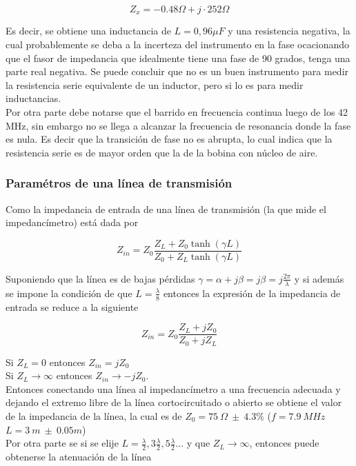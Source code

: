 \documentclass[a4paper,10pt]{article}
\begin{document}
		$$Z_x=-0.48\Omega+j\cdot 252\Omega$$
		
		\indent Es decir, se obtiene una inductancia de $L=0,96 \mu F$ y una 
		resistencia negativa, la cual probablemente se deba a la incerteza del 
		instrumento en la fase ocacionando que el fasor de impedancia que 
		idealmente tiene una fase de 90 grados, tenga una parte real negativa. 
		Se puede concluir que no es un buen instrumento para medir la 
		resistencia serie equivalente de un inductor, pero si lo es para medir 
		inductancias. \\
		\indent Por otra parte debe notarse que el barrido en frecuencia 
		continua luego de los 42 MHz, sin embargo no se llega a alcanzar la 
		frecuencia de resonancia donde la fase es nula. Es decir que la 
		transici\'on de fase no es abrupta, lo cual indica que la resistencia 
		serie es de mayor orden que la de la bobina con n\'ucleo de aire. 

		\subsubsection{Param\'etros de una l\'inea de transmisi\'on}
		
		\indent Como la impedancia de entrada de una l\'inea de transmisi\'on 
		(la que mide el impedanc\'imetro) est\'a dada por 
		
		$$Z_{in}=Z_0\frac{Z_L+Z_0\tanh(\gamma L)}{Z_0+Z_L\tanh(\gamma L)}$$
		
		\indent Suponiendo que la l\'inea es de bajas p\'erdidas 
		$\gamma=\alpha+j\beta=j\beta=j\frac{2\pi}{\lambda}$ y si adem\'as se 
		impone la condici\'on de que $L=\frac{\lambda}{8}$ entonces la 
		expresi\'on de la impedancia de entrada se reduce a la siguiente
		
		$$Z_{in}=Z_0\frac{Z_L+jZ_0}{Z_0+jZ_L}$$
		
		\indent Si $Z_L= 0$ entonces $Z_{in}=jZ_0$ \\
		\indent Si $Z_L \rightarrow \infty$ entonces $Z_{in}\rightarrow-jZ_0$.\\
		\indent Entonces conectando una l\'inea al impedanc\'imetro a una 
		frecuencia adecuada y dejando el extremo libre de la l\'inea 
		cortocircuitado o abierto se obtiene el valor de la impedancia de la 
		l\'inea, la cual es de 
		$Z_0=75~\Omega~\pm~4.3\%$ ($f=7.9~MHz$ $L=3~m~\pm~0.05m$) \\
		
		\indent Por otra parte se si se elije 
		$L=\frac{\lambda}{2},3\frac{\lambda}{2}, 5\frac{\lambda}{2} ...$ y que 
		$Z_L\rightarrow\infty$, entonces puede obtenerse la atenuaci\'on de la 
		l\'inea
		
\end{document}
